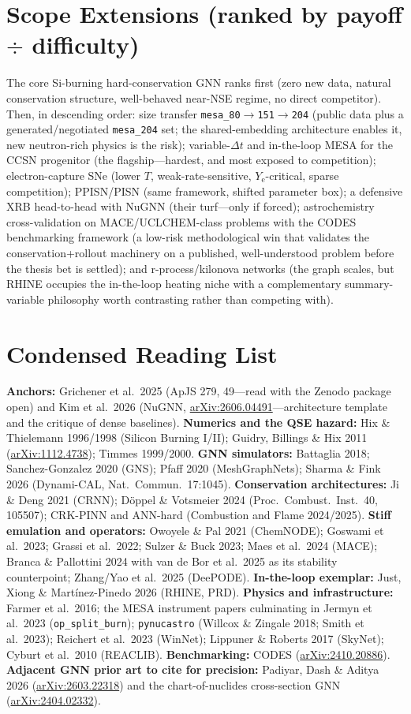 \documentclass[11pt,a4paper]{article}
\newcommand{\Ye}{\ensuremath{Y_{\mathrm{e}}}}
\newcommand{\code}[1]{\texttt{#1}}
\newcommand{\arxiv}[1]{\href{https://arxiv.org/abs/#1}{arXiv:#1}}
\begin{document}
\section{Scope Extensions (ranked by payoff $\div$ difficulty)}

The core Si-burning hard-conservation GNN ranks first (zero new data, natural conservation structure, well-behaved near-NSE regime, no direct competitor). Then, in descending order: size transfer \code{mesa\_80}$\to$\code{151}$\to$\code{204} (public data plus a generated/negotiated \code{mesa\_204} set; the shared-embedding architecture enables it, new neutron-rich physics is the risk); variable-$\Delta t$ and in-the-loop MESA for the CCSN progenitor (the flagship---hardest, and most exposed to competition); electron-capture SNe (lower $T$, weak-rate-sensitive, \Ye-critical, sparse competition); PPISN/PISN (same framework, shifted parameter box); a defensive XRB head-to-head with NuGNN (their turf---only if forced); astrochemistry cross-validation on MACE/UCLCHEM-class problems with the CODES benchmarking framework (a low-risk methodological win that validates the conservation+rollout machinery on a published, well-understood problem before the thesis bet is settled); and r-process/kilonova networks (the graph scales, but RHINE occupies the in-the-loop heating niche with a complementary summary-variable philosophy worth contrasting rather than competing with).

\section{Condensed Reading List}

\textbf{Anchors:} Grichener et al.\ 2025 (ApJS 279, 49---read with the Zenodo package open) and Kim et al.\ 2026 (NuGNN, \arxiv{2606.04491}---architecture template and the critique of dense baselines). \textbf{Numerics and the QSE hazard:} Hix \& Thielemann 1996/1998 (Silicon Burning I/II); Guidry, Billings \& Hix 2011 (\arxiv{1112.4738}); Timmes 1999/2000. \textbf{GNN simulators:} Battaglia 2018; Sanchez-Gonzalez 2020 (GNS); Pfaff 2020 (MeshGraphNets); Sharma \& Fink 2026 (Dynami-CAL, Nat.\ Commun.\ 17:1045). \textbf{Conservation architectures:} Ji \& Deng 2021 (CRNN); D\"oppel \& Votsmeier 2024 (Proc.\ Combust.\ Inst.\ 40, 105507); CRK-PINN and ANN-hard (Combustion and Flame 2024/2025). \textbf{Stiff emulation and operators:} Owoyele \& Pal 2021 (ChemNODE); Goswami et al.\ 2023; Grassi et al.\ 2022; Sulzer \& Buck 2023; Maes et al.\ 2024 (MACE); Branca \& Pallottini 2024 with van de Bor et al.\ 2025 as its stability counterpoint; Zhang/Yao et al.\ 2025 (DeePODE). \textbf{In-the-loop exemplar:} Just, Xiong \& Mart\'inez-Pinedo 2026 (RHINE, PRD). \textbf{Physics and infrastructure:} Farmer et al.\ 2016; the MESA instrument papers culminating in Jermyn et al.\ 2023 (\code{op\_split\_burn}); \code{pynucastro} (Willcox \& Zingale 2018; Smith et al.\ 2023); Reichert et al.\ 2023 (WinNet); Lippuner \& Roberts 2017 (SkyNet); Cyburt et al.\ 2010 (REACLIB). \textbf{Benchmarking:} CODES (\arxiv{2410.20886}). \textbf{Adjacent GNN prior art to cite for precision:} Padiyar, Dash \& Aditya 2026 (\arxiv{2603.22318}) and the chart-of-nuclides cross-section GNN (\arxiv{2404.02332}).
\end{document}
